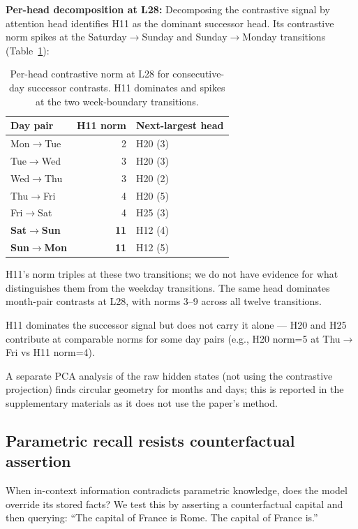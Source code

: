 \documentclass[11pt]{article}
\begin{document}
\textbf{Per-head decomposition at L28:} Decomposing the contrastive signal by
attention head identifies H11 as the dominant successor head. Its contrastive
norm spikes at the Saturday$\rightarrow$Sunday and Sunday$\rightarrow$Monday transitions (Table~\ref{tab:successor}):

\begin{table}[htbp]
\centering
\small
\begin{tabular}{lrl}
\toprule
Day pair & H11 norm & Next-largest head \\
\midrule
Mon$\rightarrow$Tue & 2 & H20 (3) \\
Tue$\rightarrow$Wed & 3 & H20 (3) \\
Wed$\rightarrow$Thu & 3 & H20 (2) \\
Thu$\rightarrow$Fri & 4 & H20 (5) \\
Fri$\rightarrow$Sat & 4 & H25 (3) \\
\textbf{Sat$\rightarrow$Sun} & \textbf{11} & H12 (4) \\
\textbf{Sun$\rightarrow$Mon} & \textbf{11} & H12 (5) \\
\bottomrule
\end{tabular}
\caption{Per-head contrastive norm at L28 for consecutive-day successor contrasts. H11 dominates and spikes at the two week-boundary transitions.}
\label{tab:successor}
\end{table}

H11's norm triples at these two transitions; we do not have evidence for what
distinguishes them from the weekday transitions. The same head dominates
month-pair contrasts at L28, with norms 3--9 across all twelve transitions.

H11 dominates the successor signal but does not carry it alone --- H20 and H25
contribute at comparable norms for some day pairs (e.g., H20 norm=5 at
Thu$\rightarrow$Fri vs H11 norm=4).

A separate PCA analysis of the raw hidden states (not using the contrastive
projection) finds circular geometry for months and days; this is reported in
the supplementary materials as it does not use the paper's method.

\subsection{Parametric recall resists counterfactual assertion}

When in-context information contradicts parametric knowledge, does the model
override its stored facts? We test this by asserting a counterfactual capital
and then querying: ``The capital of France is Rome. The capital of France is.''
\end{document}
